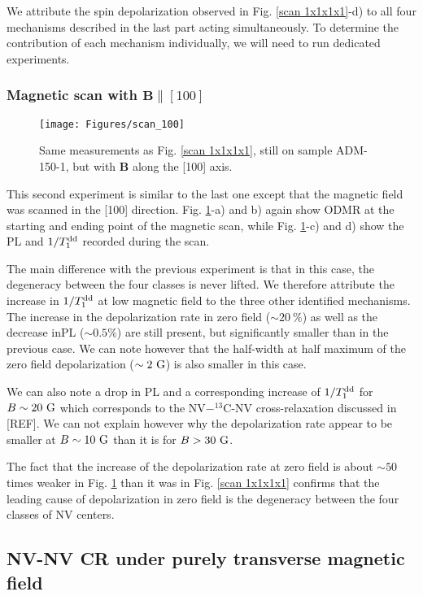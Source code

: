 \documentclass[a4paper,11pt]{report}
\begin{document}
We attribute the spin depolarization observed in Fig. \ref{scan 1x1x1x1}-d) to all four mechanisms described in the last part acting simultaneously. To determine the contribution of each mechanism individually, we will need to run dedicated experiments.

\subsubsection{Magnetic scan with $\mathbf{B} \parallel [100]$}

\begin{figure}[h]
\centering
\texttt{[image: Figures/scan\_100]}
\caption{Same measurements as Fig. \ref{scan 1x1x1x1}, still on sample ADM-150-1, but with $\mathbf{B}$ along the [100] axis.}
\label{scan 100}
\end{figure}

This second experiment is similar to the last one except that the magnetic field was scanned in the [100] direction. Fig. \ref{scan 100}-a) and b) again show ODMR at the starting and ending point of the magnetic scan, while Fig. \ref{scan 100}-c) and d) show the PL and $1/T_1^{\rm dd}$ recorded during the scan.

The main difference with the previous experiment is that in this case, the degeneracy between the four classes is never lifted. We therefore attribute the increase in $1/T_1^{\rm dd}$ at low magnetic field to the three other identified mechanisms. The increase in the depolarization rate in zero field ($\sim 20\ \%$) as well as the decrease inPL ($\sim 0.5 \%$) are still present, but significantly smaller than in the previous case. We can note however that the half-width at half maximum of the zero field depolarization ($\sim 2\ \rm G$) is also smaller in this case.

We can also note a drop in PL and a corresponding increase of $1/T_1^{\rm dd}$ for $B \sim 20\ \rm G$ which corresponds to the NV$-^{13}$C-NV cross-relaxation discussed in [REF]. We can not explain however why the depolarization rate appear to be smaller at $B \sim 10\ \rm G$ than it is for $B > 30\ \rm G$.

The fact that the increase of the depolarization rate at zero field is about $\sim 50$ times weaker in Fig. \ref{scan 100} than it was in Fig. \ref{scan 1x1x1x1} confirms that the leading cause of depolarization in zero field is the degeneracy between the four classes of NV centers. 

\subsection{NV-NV CR under purely transverse magnetic field}
\end{document}
